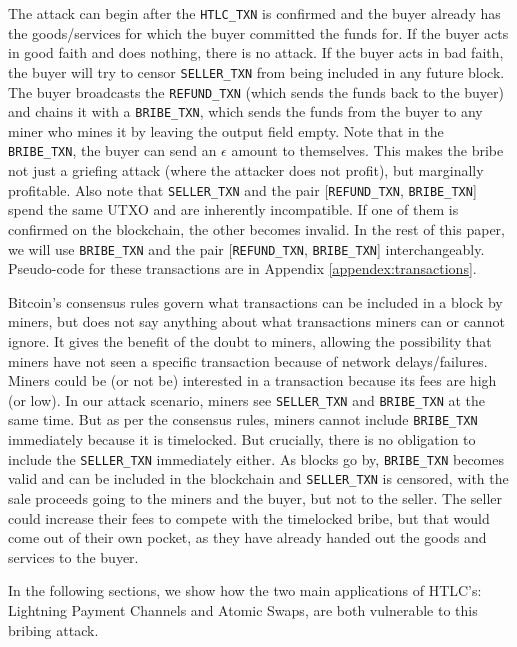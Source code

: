 \documentclass[runningheads]{llncs}
\newcommand{\htlctxn}{\texttt{HTLC\_TXN}}
\newcommand{\sellertxn}{\texttt{SELLER\_TXN}}
\newcommand{\bribetxn}{\texttt{BRIBE\_TXN}}
\newcommand{\refundtxn}{\texttt{REFUND\_TXN}}
\begin{document}
The attack can begin after the \htlctxn{} is confirmed and the buyer already has the goods/services for which the buyer committed the funds for. If the buyer acts in good faith and does nothing, there is no attack. If the buyer acts in bad faith, the buyer will try to censor \sellertxn{} from being included in any future block. The buyer broadcasts the \refundtxn{} (which sends the funds back to the buyer) and chains it with a \bribetxn{}, which sends the funds from the buyer to any miner who mines it by leaving the output field empty. Note that in the \bribetxn{}, the buyer can send an $\epsilon$ amount to themselves. This makes the bribe not just a griefing attack (where the attacker does not profit), but marginally profitable. Also note that \sellertxn{} and the pair [\refundtxn{}, \bribetxn{}] spend the same UTXO and are inherently incompatible. If one of them is confirmed on the blockchain, the other becomes invalid. In the rest of this paper, we will use \bribetxn{} and the pair [\refundtxn{}, \bribetxn{}] interchangeably. Pseudo-code for these transactions are in Appendix \ref{appendex:transactions}. 

Bitcoin's consensus rules govern what transactions can be included in a block by miners, but does not say anything about what transactions miners can or cannot ignore. It gives the benefit of the doubt to miners, allowing the possibility that miners have not seen a specific transaction because of network delays/failures. Miners could be (or not be) interested in a transaction because its fees are high (or low). In our attack scenario, miners see \sellertxn{} and \bribetxn{} at the same time. But as per the consensus rules, miners cannot include \bribetxn{} immediately because it is timelocked. But crucially, there is no obligation to include the \sellertxn{} immediately either. As blocks go by, \bribetxn{} becomes valid and can be included in the blockchain and  \sellertxn{} is censored, with the sale proceeds going to the miners and the buyer, but not to the seller. The seller could increase their fees to compete with the timelocked bribe, but that would come out of their own pocket, as they have already handed out the goods and services to the buyer.

In the following sections, we show how the two main applications of HTLC's: Lightning Payment Channels and Atomic Swaps, are both vulnerable to this bribing attack.
\end{document}
